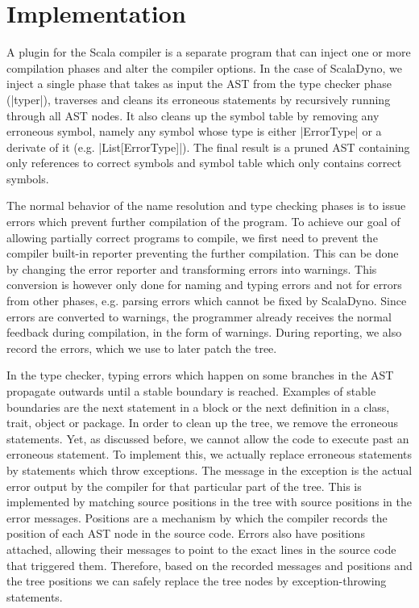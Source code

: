 \section{Implementation}

A plugin for the Scala compiler is a separate program that can inject one or more compilation phases and alter the compiler options. In the case of ScalaDyno, we inject a single phase that takes as input the AST from the type checker phase (|typer|), traverses and cleans its erroneous statements by recursively running through all AST nodes. It also cleans up the symbol table by removing any erroneous symbol, namely any symbol whose type is either |ErrorType| or a derivate of it (e.g. |List[ErrorType]|). The final result is a pruned AST containing only references to correct symbols and symbol table which only contains correct symbols.

The normal behavior of the name resolution and type checking phases is to issue errors which prevent further compilation of the program. To achieve our goal of allowing partially correct programs to compile, we first need to prevent the compiler built-in reporter preventing the further compilation. This can be done by changing the error reporter and transforming errors into warnings. This conversion is however only done for naming and typing errors and not for errors from other phases, e.g. parsing errors which cannot be fixed by ScalaDyno. Since errors are converted to warnings, the programmer already receives the normal feedback during compilation, in the form of warnings. During reporting, we also record the errors, which we use to later patch the tree.

In the type checker, typing errors which happen on some branches in the AST propagate outwards until a stable boundary is reached. Examples of stable boundaries are the next statement in a block or the next definition in a class, trait, object or package. In order to clean up the tree, we remove the erroneous statements. Yet, as discussed before, we cannot allow the code to execute past an erroneous statement. To implement this, we actually replace erroneous statements by statements which throw exceptions. The message in the exception is the actual error output by the compiler for that particular part of the tree. This is implemented by matching source positions in the tree with source positions in the error messages. Positions are a mechanism by which the compiler records the position of each AST node in the source code. Errors also have positions attached, allowing their messages to point to the exact lines in the source code that triggered them. Therefore, based on the recorded messages and positions and the tree positions we can safely replace the tree nodes by exception-throwing statements.

